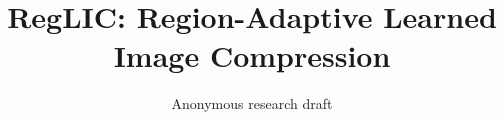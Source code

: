 \documentclass[10pt,twocolumn,letterpaper]{article}
\title{RegLIC: Region-Adaptive Learned Image Compression}
\author{Anonymous research draft}
\begin{document}
\raggedbottom
\maketitle







\clearpage
{\small}
\end{document}
